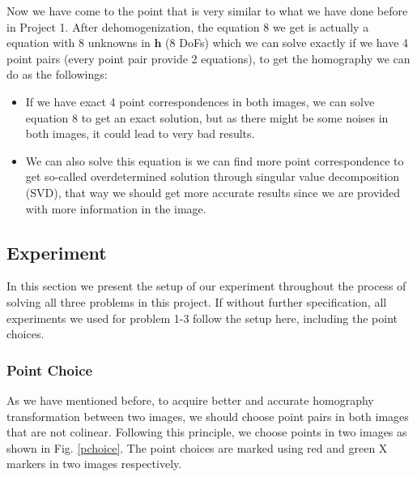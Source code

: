 \documentclass[conference]{IEEEtran}
\newcommand{\mat}[1]{\mathbf{#1}} %
\begin{document}
Now we have come to the point that is very similar to what we have done before in Project 1. After dehomogenization, the equation 8 we get is actually a equation with 8 unknowns in $\mat{h}$ (8 DoFs) which we can solve exactly if we have 4 point pairs (every point pair provide 2 equations), to get the homography we can do as the followings:
\begin{itemize}
	\item If we have exact 4 point correspondences in both images, we can solve equation 8 to get an exact solution, but as there might be some noises in both images, it could lead to very bad results.
	\item We can also solve this equation is we can find more point correspondence to get so-called overdetermined solution through singular value decomposition (SVD), that way we should get more accurate results since we are provided with more information in the image.
\end{itemize}


\subsection{Experiment}
In this section we present the setup of our experiment throughout the process of solving all three problems in this project. If without further specification, all experiments we used for problem 1-3 follow the setup here, including the point choices.
\subsubsection{Point Choice}
As we have mentioned before, to acquire better and accurate homography transformation between two images, we should choose point pairs in both images that are not colinear. Following this principle, we choose points in two images as shown in Fig. \ref{pchoice}. The point choices are marked using red and green X markers in two images respectively.
\begin{figure*}[!hbpt]
  \caption{Point pair choices between two original images}
  \label{pchoice} %
\end{figure*}
\end{document}
